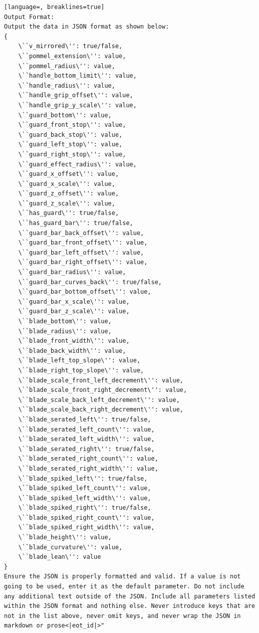 \documentclass[12pt,a4paper]{article}
\begin{document}
\begin{lstlisting}[language=, breaklines=true]
Output Format:
Output the data in JSON format as shown below:
{
    \``v_mirrored\'': true/false,
    \``pommel_extension\'': value,
    \``pommel_radius\'': value,
    \``handle_bottom_limit\'': value,
    \``handle_radius\'': value,
    \``handle_grip_offset\'': value,
    \``handle_grip_y_scale\'': value,
    \``guard_bottom\'': value,
    \``guard_front_stop\'': value,
    \``guard_back_stop\'': value,
    \``guard_left_stop\'': value,
    \``guard_right_stop\'': value,
    \``guard_effect_radius\'': value,
    \``guard_x_offset\'': value,
    \``guard_x_scale\'': value,
    \``guard_z_offset\'': value,
    \``guard_z_scale\'': value,
    \``has_guard\'': true/false,
    \``has_guard_bar\'': true/false,
    \``guard_bar_back_offset\'': value,
    \``guard_bar_front_offset\'': value,
    \``guard_bar_left_offset\'': value,
    \``guard_bar_right_offset\'': value,
    \``guard_bar_radius\'': value,
    \``guard_bar_curves_back\'': true/false,
    \``guard_bar_bottom_offset\'': value,
    \``guard_bar_x_scale\'': value,
    \``guard_bar_z_scale\'': value,
    \``blade_bottom\'': value,
    \``blade_radius\'': value,
    \``blade_front_width\'': value,
    \``blade_back_width\'': value,
    \``blade_left_top_slope\'': value,
    \``blade_right_top_slope\'': value,
    \``blade_scale_front_left_decrement\'': value,
    \``blade_scale_front_right_decrement\'': value,
    \``blade_scale_back_left_decrement\'': value,
    \``blade_scale_back_right_decrement\'': value,
    \``blade_serated_left\'': true/false,
    \``blade_serated_left_count\'': value,
    \``blade_serated_left_width\'': value,
    \``blade_serated_right\'': true/false,
    \``blade_serated_right_count\'': value,
    \``blade_serated_right_width\'': value,
    \``blade_spiked_left\'': true/false,
    \``blade_spiked_left_count\'': value,
    \``blade_spiked_left_width\'': value,
    \``blade_spiked_right\'': true/false,
    \``blade_spiked_right_count\'': value,
    \``blade_spiked_right_width\'': value,
    \``blade_height\'': value,
    \``blade_curvature\'': value,
    \``blade_lean\'': value
}
Ensure the JSON is properly formatted and valid. If a value is not going to be used, enter it as the default parameter. Do not include any additional text outside of the JSON. Include all parameters listed within the JSON format and nothing else. Never introduce keys that are not in the list above, never omit keys, and never wrap the JSON in markdown or prose<|eot_id|>"
\end{lstlisting}
\end{document}

